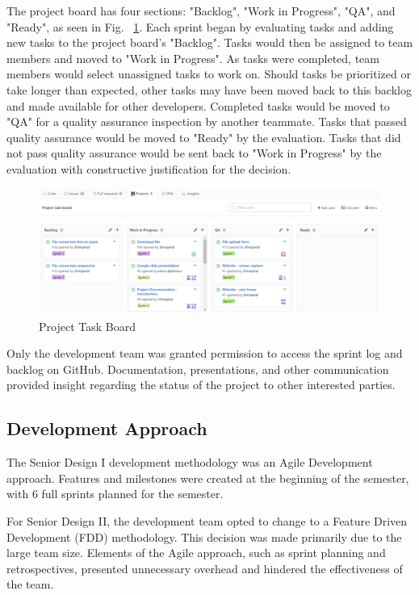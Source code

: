 The project board has four sections: "Backlog", "Work in Progress", "QA", and "Ready", as seen in Fig. 
~\ref{fig:ProjectTaskBoard}. Each sprint began by evaluating tasks and adding new tasks to the project board's "Backlog". Tasks would then be assigned to team members and moved to "Work in Progress". As tasks were completed, team members would select unassigned tasks to work on. Should tasks be prioritized or take longer than expected, other tasks may have been moved back to this backlog and made available for other developers. Completed tasks would be moved to "QA" for a quality assurance inspection by another teammate. Tasks that passed quality assurance would be moved to "Ready" by the evaluation. Tasks that did not pass quality assurance would be sent back to "Work in Progress" by the evaluation with constructive justification for the decision. 

\begin{figure}[H]
    \centering
    \includegraphics[width=\textwidth]{ProjectTaskBoard.png}
    \caption{Project Task Board}
    \label{fig:ProjectTaskBoard}
\end{figure}

Only the development team was granted permission to access the sprint log and backlog on GitHub. Documentation, presentations, and other communication provided insight regarding the status of the project to other interested parties. 

\subsection{Development Approach}
The Senior Design I development methodology was an Agile Development approach. Features and milestones were created at the beginning of the semester, with 6 full sprints planned for the semester.

For Senior Design II, the development team opted to change to a Feature Driven Development (FDD) methodology. This decision was made primarily due to the large team size. Elements of the Agile approach, such as sprint planning and retrospectives, presented unnecessary overhead and hindered the effectiveness of the team.


